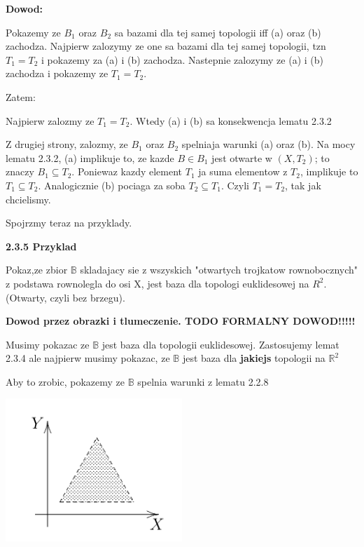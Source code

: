 \documentclass{article}
\begin{document}
\textbf{Dowod:}

Pokazemy ze $B_{1}$ oraz $B_{2}$ sa bazami dla tej samej topologii iff (a) oraz (b) zachodza. Najpierw zalozymy ze one sa bazami dla tej samej topologii, tzn $T_{1} = T_{2}$ i pokazemy za (a) i (b) zachodza. Nastepnie zalozymy ze (a) i (b) zachodza i pokazemy ze $T_{1} = T_{2}$.

Zatem:

Najpierw zalozmy ze $T_{1} = T_{2}$. Wtedy (a) i (b) sa konsekwencja lematu 2.3.2

Z drugiej strony, zalozmy, ze $B_{1}$ oraz $B_{2}$ spelniaja warunki (a) oraz (b). Na mocy lematu 2.3.2, (a) implikuje to, ze kazde $B \in B_{1}$ jest otwarte w $(X,T_{2})$; to znaczy $B_{1} \subseteq T_{2}$. Poniewaz kazdy element $T_{1}$ ja suma elementow z $T_{2}$, implikuje to $T_{1} \subseteq T_{2}$. Analogicznie (b) pociaga za soba $T_{2} \subseteq T_{1}$. Czyli $T_{1} = T_{2}$, tak jak chcielismy.

Spojrzmy teraz na przyklady.

\textbf{2.3.5 Przyklad}

Pokaz,ze zbior $\mathbb{B}$ skladajacy sie z wszyskich "otwartych trojkatow rownobocznych" z podstawa rownolegla do osi X, jest baza dla topologi euklidesowej na $R^{2}$.(Otwarty, czyli bez brzegu).

\textbf{Dowod przez obrazki i tlumeczenie. TODO FORMALNY DOWOD!!!!!}

Musimy pokazac ze $\mathbb{B}$ jest baza dla topologii euklidesowej. Zastosujemy lemat 2.3.4 ale najpierw musimy pokazac, ze $\mathbb{B}$ jest baza dla \textbf{jakiejs} topologii na $\mathbb{R}^{2}$ 

Aby to zrobic, pokazemy ze $\mathbb{B}$ spelnia warunki z lematu 2.2.8

\begin{center}
    \begin{minipage}[h]{0.8\textwidth}
        \centering
        \includegraphics[width=0.5\textwidth]{trojkat1.png}
    \end{minipage}
\end{center}
\end{document}
